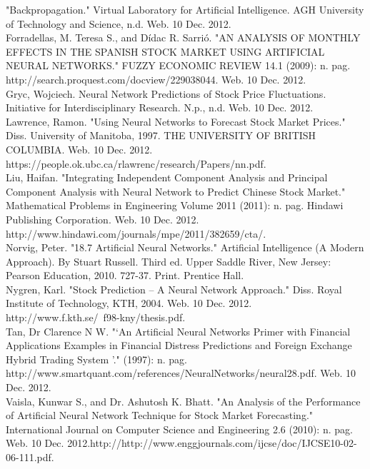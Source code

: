 \documentclass[a4paper,11pt]{article}
\begin{document}
"Backpropagation." Virtual Laboratory for Artificial Intelligence. AGH University of Technology and Science, n.d. Web. 10 Dec. 2012.\\


Forradellas, M. Teresa S., and Dídac R. Sarrió. "AN ANALYSIS OF MONTHLY EFFECTS IN THE SPANISH STOCK MARKET USING ARTIFICIAL NEURAL NETWORKS." FUZZY ECONOMIC REVIEW 14.1 (2009): n. pag.\\ http://search.proquest.com/docview/229038044. Web. 10 Dec. 2012.\\

Gryc, Wojciech. Neural Network Predictions of Stock Price Fluctuations. Initiative for Interdisciplinary Research. N.p., n.d. Web. 10 Dec. 2012.\\

Lawrence, Ramon. "Using Neural Networks to Forecast Stock Market Prices." Diss. University of Manitoba, 1997. THE UNIVERSITY OF BRITISH COLUMBIA. Web. 10 Dec. 2012. https://people.ok.ubc.ca/rlawrenc/research/Papers/nn.pdf.\\

Liu, Haifan. "Integrating Independent Component Analysis and Principal Component Analysis with Neural Network to Predict Chinese Stock Market." Mathematical Problems in Engineering Volume 2011 (2011): n. pag. Hindawi Publishing Corporation. Web. 10 Dec. 2012. http://www.hindawi.com/journals/mpe/2011/382659/cta/.\\

Norvig, Peter. "18.7 Artificial Neural Networks." Artificial Intelligence (A Modern Approach). By Stuart Russell. Third ed. Upper Saddle River, New Jersey: Pearson Education, 2010. 727-37. Print. Prentice Hall.\\

Nygren, Karl. "Stock Prediction – A Neural Network Approach." Diss. Royal Institute of Technology, KTH, 2004. Web. 10 Dec. 2012. http://www.f.kth.se/~f98-kny/thesis.pdf.\\

Tan, Dr Clarence N W. "‘An Artificial Neural Networks Primer with Financial Applications Examples in Financial Distress Predictions and Foreign Exchange Hybrid Trading System ’." (1997): n. pag.\\ http://www.smartquant.com/references/NeuralNetworks/neural28.pdf. Web. 10 Dec. 2012. \\

Vaisla, Kunwar S., and Dr. Ashutosh K. Bhatt. "An Analysis of the Performance of Artificial Neural Network Technique for Stock Market Forecasting." International Journal on Computer Science and Engineering 2.6 (2010): n. pag. Web. 10 Dec. 2012.http://http://www.enggjournals.com/ijcse/doc/IJCSE10-02-06-111.pdf.\clearpage
\end{document}
